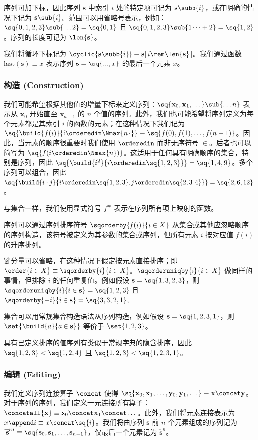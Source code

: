 序列可加下标，因此序列 $\mathbf{s}$ 中索引 $i$ 处的特定项可记为 $\mathbf{s}\subb{i}$，或在明确的情况下记为 $\mathbf{s}\sub{i}$。范围可以用省略号表示，例如：$\sq{0, 1, 2, 3}\sub{\dots2} = \sq{0, 1}$ 且 $\sq{0, 1, 2, 3}\sub{1\dots+2} = \sq{1, 2}$。序列的长度可记为 $\len{\mathbf{s}}$。

我们将循环下标记为 $\cyclic{\mathbf{s}\subb{i}} \equiv \mathbf{s}[\,i \rem \len{\mathbf{s}}\,]$。我们通过函数 $\text{last}(\mathbf{s}) \equiv x$ 表示序列 $\mathbf{s} = \sq{..., x}$ 的最后一个元素 $x$。

\subsubsection{构造 (Construction)}
我们可能希望根据其他值的增量下标来定义序列：$\sq{\mathbf{x}_0, \mathbf{x}_1, \dots }\sub{\dots n}$ 表示从 $\mathbf{x}_0$ 开始直至 $\mathbf{x}_{n-1}$ 的 $n$ 个值的序列。此外，我们也可能希望将序列定义为每个元素都是其索引 $i$ 的函数的元素；在这种情况下我们记为 $\sq{\build{f(i)}{i \orderedin \Nmax{n}}} \equiv \sq{f(0), f(1), \dots, f(n - 1)}$。因此，当元素的顺序很重要时我们使用 $\orderedin$ 而非无序符号 $\in$。后者也可以简写为 $\sq{f(i \orderedin \Nmax{n})}$。这适用于任何具有明确顺序的集合，特别是序列，因此 $\sq{\build{i^2}{i \orderedin \sq{1, 2, 3}}} = \sq{1, 4, 9}$。多个序列可以组合，因此 $\sq{\build{i \cdot j}{i \orderedin \sq{1, 2, 3}, j \orderedin \sq{2, 3, 4}}} = \sq{2, 6, 12}$。

与集合一样，我们使用显式符号 $f^{\#}$ 表示在序列所有项上映射的函数。

序列可以通过序列排序符号 $\sqorderby{f(i)}{i \in X}$ 从集合或其他应忽略顺序的序列构造，该符号被定义为其参数的集合或序列，但所有元素 $i$ 按对应值 $f(i)$ 的升序排列。

键分量可以省略，在这种情况下假定按元素直接排序；即 $\order{i \in X} \equiv \sqorderby{i}{i \in X}$。$\sqorderuniqby{i}{i \in X}$ 做同样的事情，但排除 $i$ 的任何重复值。例如假设 $\mathbf{s} = \sq{1, 3, 2, 3}$，则 $\sqorderuniqby{i}{i \in \mathbf{s}} = \sq{1, 2, 3}$ 且 $\sqorderby{-i}{i \in \mathbf{s}} = \sq{3, 3, 2, 1}$。

集合可以用常规集合构造语法从序列构造，例如假设 $\mathbf{s} = \sq{1, 2, 3, 1}$，则 $\set{\build{a}{a \in \mathbf{s}}}$ 等价于 $\set{1, 2, 3}$。

具有已定义排序的值序列有类似于常规字典的隐含排序，因此 $\sq{1, 2, 3} < \sq{1, 2, 4}$ 且 $\sq{1, 2, 3} < \sq{1, 2, 3, 1}$。

\subsubsection{编辑 (Editing)}
我们定义序列连接算子 $\concat$ 使得 $\sq{\mathbf{x}_0, \mathbf{x}_1, \dots, \mathbf{y}_0, \mathbf{y}_1, \dots} \equiv \mathbf{x} \concat \mathbf{y}$。对于序列的序列，我们定义一元连接所有算子：$\concatall{\mathbf{x}}\equiv\mathbf{x}_0 \concat \mathbf{x}_1 \concat \dots$。此外，我们将元素连接表示为 $x \append i \equiv x \concat \sq{i}$。我们将由序列 $\mathbf{s}$ 前 $n$ 个元素组成的序列记为 ${\overrightarrow{\mathbf{s}}}^n \equiv \sq{\mathbf{s}_0, \mathbf{s}_1, \dots, \mathbf{s}_{n-1}}$，仅最后一个元素记为 ${\overleftarrow{\mathbf{s}}}^n$。

